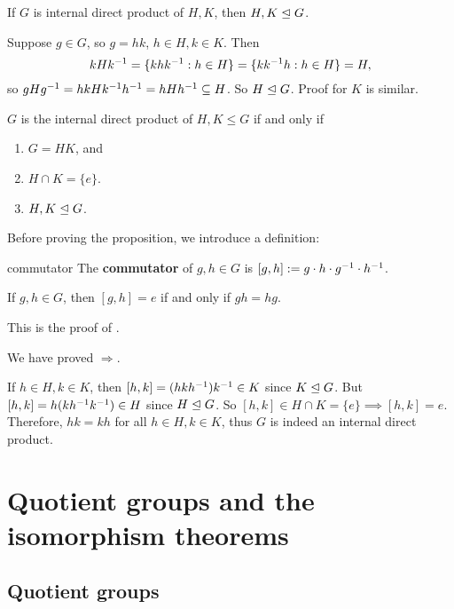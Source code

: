 \begin{lemma}
If $G$ is internal direct product of $H,K$, then $H,K\trianglelefteq G$.
\end{lemma}

\begin{pf}
Suppose $g\in G$, so $g=hk$, $h\in H,k\in K$. Then 
$$kHk^{-1} = \{khk^{-1}: h\in H\}= \{kk^{-1} h: h\in H\}=H,$$
so $gHg^{-1} = hkHk^{-1} h^{-1} = hHh^{-1} \subseteq H$. So $H\trianglelefteq G$. Proof for $K$ is similar.
\end{pf}

\begin{prop}
$G$ is the internal direct product of $H,K\le G$ if and only if 
\begin{enumerate}[label=(\alph*)]
\item $G=HK$, and 
\item $H\cap K=\{e\}$.
\item $H,K\trianglelefteq G$.
\end{enumerate}
\end{prop}

Before proving the proposition, we introduce a definition:

\begin{defn}{commutator}
The \textbf{commutator} of $g,h\in G$ is $[g,h]:=g\cdot h\cdot g^{-1} \cdot h^{-1}$.
\end{defn}

\begin{lemma}
If $g,h\in G$, then $[g,h]=e$ if and only if $gh=hg$.
\end{lemma}

\begin{pf}
This is the proof of .

We have proved $\Rightarrow$.

If $h\in H,k\in K$, then $[h,k]=(hkh^{-1})k^{-1} \in K$ since $K\trianglelefteq G$. But $[h,k]= h(kh^{-1} k^{-1})\in H$ since $H\trianglelefteq G$. So $[h,k]\in H\cap K=\{e\}\implies [h,k]=e$. Therefore, $hk=kh$ for all $h\in H,k\in K$, thus $G$ is indeed an internal direct product.
\end{pf}

\chapter{Quotient groups and the isomorphism theorems} 

\section{Quotient groups}

\printindex


